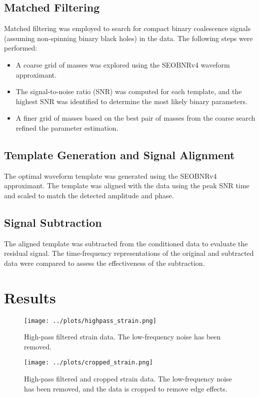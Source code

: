 \documentclass{article}
\begin{document}
\subsection{Matched Filtering}
Matched filtering was employed to search for compact binary coalescence signals (assuming non-spinning binary black holes) in the data. The following steps were performed:
\begin{itemize}
    \item A coarse grid of masses was explored using the SEOBNRv4 waveform approximant.
    \item The signal-to-noise ratio (SNR) was computed for each template, and the highest SNR was identified to determine the most likely binary parameters.
    \item A finer grid of masses based on the best pair of masses from the coarse search refined the parameter estimation.
\end{itemize}

\subsection{Template Generation and Signal Alignment}
The optimal waveform template was generated using the SEOBNRv4 approximant. The template was aligned with the data using the peak SNR time and scaled to match the detected amplitude and phase.

\subsection{Signal Subtraction}
The aligned template was subtracted from the conditioned data to evaluate the residual signal. The time-frequency representations of the original and subtracted data were compared to assess the effectiveness of the subtraction.

\section{Results}

\begin{figure}[H]
    \centering
    \texttt{[image: ../plots/highpass\_strain.png]}
    \caption{High-pass filtered strain data. The low-frequency noise has been removed.}
    \label{fig:highpass_strain}
\end{figure}

\begin{figure}[H]
    \centering
    \texttt{[image: ../plots/cropped\_strain.png]}
    \caption{High-pass filtered and cropped strain data. The low-frequency noise has been removed, and the data is cropped to remove edge effects.}
    \label{fig:cropped_strain}
\end{figure}
\end{document}
